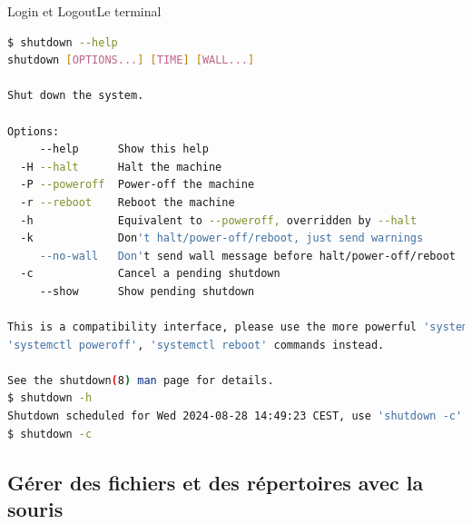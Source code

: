 \documentclass{beamer}
\begin{document}
    \begin{frame}[fragile]{Login et Logout}{Le terminal}
        \begin{lstlisting}[language=bash,basicstyle=\tiny\ttfamily]
$ shutdown --help
shutdown [OPTIONS...] [TIME] [WALL...]

Shut down the system.

Options:
     --help      Show this help
  -H --halt      Halt the machine
  -P --poweroff  Power-off the machine
  -r --reboot    Reboot the machine
  -h             Equivalent to --poweroff, overridden by --halt
  -k             Don't halt/power-off/reboot, just send warnings
     --no-wall   Don't send wall message before halt/power-off/reboot
  -c             Cancel a pending shutdown
     --show      Show pending shutdown

This is a compatibility interface, please use the more powerful 'systemctl reboot',
'systemctl poweroff', 'systemctl reboot' commands instead.

See the shutdown(8) man page for details.
$ shutdown -h
Shutdown scheduled for Wed 2024-08-28 14:49:23 CEST, use 'shutdown -c' to cancel.
$ shutdown -c
        \end{lstlisting}
    \end{frame}

    \subsection{Gérer des fichiers et des répertoires avec la souris}\label{subsec:manage-files-and-directories-with-mouse}
\end{document}
